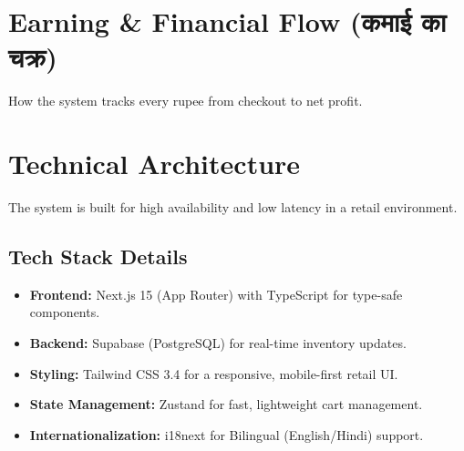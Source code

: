 \documentclass[a4paper,11pt]{article}
\begin{document}
\section{Earning \& Financial Flow (कमाई का चक्र)}
How the system tracks every rupee from checkout to net profit.

\begin{center}
\end{center}

\newpage

\section{Technical Architecture}
The system is built for high availability and low latency in a retail environment.

\subsection{Tech Stack Details}
\begin{itemize}[label=$\bullet$]
    \item \textbf{Frontend:} Next.js 15 (App Router) with TypeScript for type-safe components.
    \item \textbf{Backend:} Supabase (PostgreSQL) for real-time inventory updates.
    \item \textbf{Styling:} Tailwind CSS 3.4 for a responsive, mobile-first retail UI.
    \item \textbf{State Management:} Zustand for fast, lightweight cart management.
    \item \textbf{Internationalization:} i18next for Bilingual (English/Hindi) support.
\end{itemize}
\end{document}
